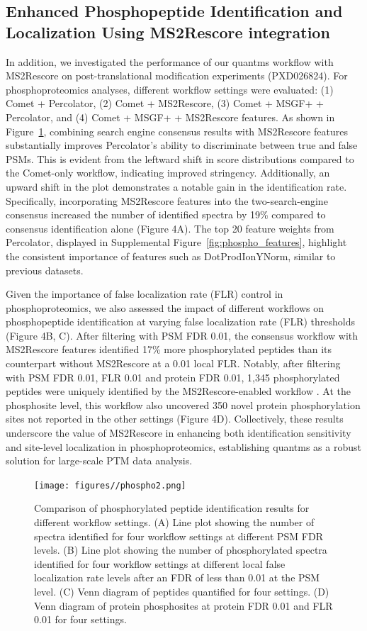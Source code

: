 \documentclass[12pt]{article}
\begin{document}
\subsection{Enhanced Phosphopeptide Identification and Localization Using MS2Rescore integration}
In addition, we investigated the performance of our quantms workflow with MS2Rescore on post-translational modification experiments (PXD026824). For phosphoproteomics analyses, different workflow settings were evaluated: (1) Comet + Percolator, (2) Comet + MS2Rescore, (3) Comet + MSGF+ + Percolator, and (4) Comet + MSGF+ + MS2Rescore features. As shown in Figure~\ref{fig:PXD026824_ms2rescore}, combining search engine consensus results with MS2Rescore features substantially improves Percolator's ability to discriminate between true and false PSMs. This is evident from the leftward shift in score distributions compared to the Comet-only workflow, indicating improved stringency. Additionally, an upward shift in the plot demonstrates a notable gain in the identification rate. Specifically, incorporating MS2Rescore features into the two-search-engine consensus increased the number of identified spectra by 19\% compared to consensus identification alone (Figure 4A). The top 20 feature weights from Percolator, displayed in Supplemental Figure~\ref{fig:phospho_features}, highlight the consistent importance of features such as DotProdIonYNorm, similar to previous datasets.

Given the importance of false localization rate (FLR) control in phosphoproteomics, we also assessed the impact of different workflows on phosphopeptide identification at varying false localization rate (FLR) thresholds (Figure 4B, C). After filtering with PSM FDR 0.01, the consensus workflow with MS2Rescore features identified 17\% more phosphorylated peptides than its counterpart without MS2Rescore at a 0.01 local FLR. Notably, after filtering with PSM FDR 0.01, FLR 0.01 and protein FDR 0.01, 1,345 phosphorylated peptides were uniquely identified by the MS2Rescore-enabled workflow . At the phosphosite level, this workflow also uncovered 350 novel protein phosphorylation sites not reported in the other settings (Figure 4D). Collectively, these results underscore the value of MS2Rescore in enhancing both identification sensitivity and site-level localization in phosphoproteomics, establishing quantms as a robust solution for large-scale PTM data analysis.

\begin{figure}[ht!]
	\centering
	\texttt{[image: figures//phospho2.png]}
	\caption{Comparison of phosphorylated peptide identification results for different workflow settings. (A) Line plot showing the number of spectra identified for four workflow settings at different PSM FDR levels. (B) Line plot showing the number of phosphorylated spectra identified for four workflow settings at different local false localization rate levels after an FDR of less than 0.01 at the PSM level. (C) Venn diagram of peptides quantified for four settings. (D) Venn diagram of protein phosphosites at protein FDR 0.01 and FLR 0.01 for four settings.}
	\label{fig:PXD026824_ms2rescore}
\end{figure}
\end{document}
